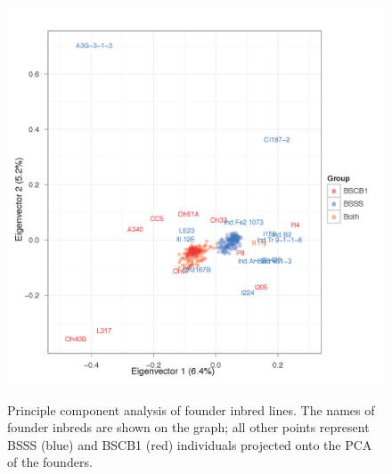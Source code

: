 \renewcommand{\thefigure}{S\arabic{figure}}
\renewcommand{\thetable}{S\arabic{table}}

\begin{figure}   
  \begin{center}
   \vspace{-0mm}
   \includegraphics[width=0.7\linewidth]{FigS1.jpg}
   \vspace{-3mm}
   \caption{ Principle component analysis of founder inbred lines. The names of founder inbreds are shown on the graph; all other points represent BSSS (blue) and BSCB1 (red) individuals projected onto the PCA of the founders.
} 
\vspace{-6mm}
    \label{fig:sfounders}
  \end{center}
\end{figure}
\clearpage

